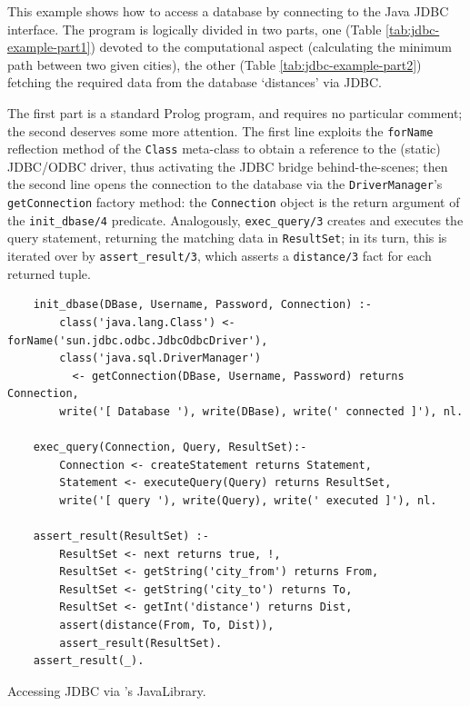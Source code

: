 This example shows how to access a database by connecting \tuprolog{} to the Java JDBC interface.
%
The program is logically divided in two parts, one (Table \ref{tab:jdbc-example-part1}) devoted to the computational aspect (calculating the minimum path between two given cities), the other (Table \ref{tab:jdbc-example-part2}) fetching the required data from the database `distances' via JDBC.

The first part is a standard Prolog program, and requires no particular comment; the second deserves some more attention. The first line exploits the \texttt{forName} reflection method of the \texttt{Class} meta-class to obtain a reference to the (static) JDBC/ODBC driver, thus activating the JDBC bridge behind-the-scenes; then the second line opens the connection to the database via the \texttt{DriverManager}'s \texttt{getConnection} factory method: the \texttt{Connection} object is the return argument of the \texttt{init\_dbase/4} predicate.
Analogously, \texttt{exec\_query/3} creates and executes the query statement, returning the matching data in \texttt{ResultSet}; in its turn, this is iterated over by \texttt{assert\_result/3}, which asserts a \texttt{distance/3} fact for each returned tuple.

\begin{table}
\small
\begin{verbatim}
    init_dbase(DBase, Username, Password, Connection) :-
        class('java.lang.Class') <- forName('sun.jdbc.odbc.JdbcOdbcDriver'),
        class('java.sql.DriverManager')
          <- getConnection(DBase, Username, Password) returns Connection,
        write('[ Database '), write(DBase), write(' connected ]'), nl.

    exec_query(Connection, Query, ResultSet):-
        Connection <- createStatement returns Statement,
        Statement <- executeQuery(Query) returns ResultSet,
        write('[ query '), write(Query), write(' executed ]'), nl.

    assert_result(ResultSet) :-
        ResultSet <- next returns true, !,
        ResultSet <- getString('city_from') returns From,
        ResultSet <- getString('city_to') returns To,
        ResultSet <- getInt('distance') returns Dist,
        assert(distance(From, To, Dist)),
        assert_result(ResultSet).
    assert_result(_).
\end{verbatim}
\caption{Accessing JDBC via \tuprolog{}'s JavaLibrary.}
\label{tab:jdbc-example-part2}
\end{table}

